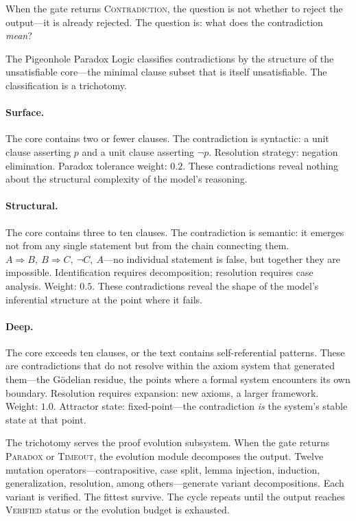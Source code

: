 \documentclass[11pt,a4paper]{article}
\begin{document}
When the gate returns \textsc{Contradiction}, the question is not whether to reject the output---it is already rejected.
The question is: what does the contradiction \emph{mean}?

The Pigeonhole Paradox Logic classifies contradictions by the structure of the unsatisfiable core---the minimal clause subset that is itself unsatisfiable.
The classification is a trichotomy.

\paragraph{Surface.}
The core contains two or fewer clauses.
The contradiction is syntactic: a unit clause asserting $p$ and a unit clause asserting $\neg p$.
Resolution strategy: negation elimination.
Paradox tolerance weight: $0.2$.
These contradictions reveal nothing about the structural complexity of the model's reasoning.

\paragraph{Structural.}
The core contains three to ten clauses.
The contradiction is semantic: it emerges not from any single statement but from the chain connecting them.
$A \Rightarrow B,\ B \Rightarrow C,\ \neg C,\ A$---no individual statement is false, but together they are impossible.
Identification requires decomposition; resolution requires case analysis.
Weight: $0.5$.
These contradictions reveal the shape of the model's inferential structure at the point where it fails.

\paragraph{Deep.}
The core exceeds ten clauses, or the text contains self-referential patterns.
These are contradictions that do not resolve within the axiom system that generated them---the G\"odelian residue, the points where a formal system encounters its own boundary.
Resolution requires expansion: new axioms, a larger framework.
Weight: $1.0$.
Attractor state: fixed-point---the contradiction \emph{is} the system's stable state at that point.

The trichotomy serves the proof evolution subsystem.
When the gate returns \textsc{Paradox} or \textsc{Timeout}, the evolution module decomposes the output.
Twelve mutation operators---contrapositive, case split, lemma injection, induction, generalization, resolution, among others---generate variant decompositions.
Each variant is verified.
The fittest survive.
The cycle repeats until the output reaches \textsc{Verified} status or the evolution budget is exhausted.
\end{document}
